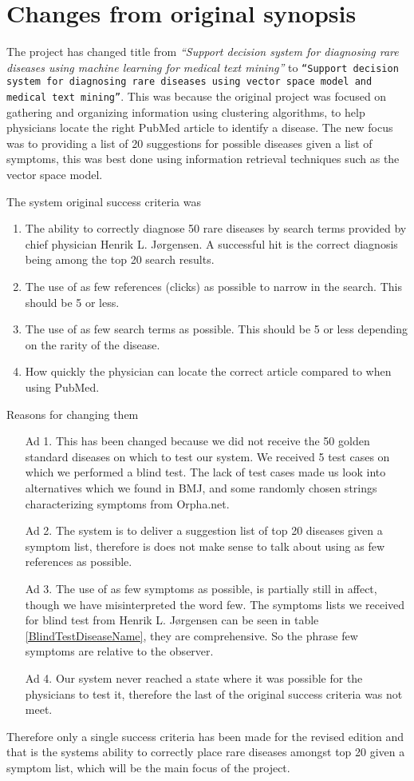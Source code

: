 \chapter*{Changes from original synopsis}

The project has changed title from \textit{``Support decision system
  for diagnosing rare diseases using machine learning for medical text
  mining''} to \texttt{``Support decision system for diagnosing rare
  diseases using vector space model and \\ medical text
  mining''}. This was because the original project was focused on
gathering and organizing information using clustering algorithms, to
help physicians locate the right PubMed article to identify a
disease. The new focus was to providing a list of 20 suggestions for
possible diseases given a list of symptoms, this was best done using
information retrieval techniques such as the vector space model.

The system original success criteria was
\begin{enumerate}
\item The ability to correctly diagnose 50 rare diseases by search
  terms provided by chief physician Henrik L. J\o rgensen. A
  successful hit is the correct diagnosis being among the top 20
  search results.
\item The use of as few references (clicks) as possible to narrow in
  the search.  This should be 5 or less.
\item The use of as few search terms as possible. This should be 5 or
  less depending on the rarity of the disease.
\item How quickly the physician can locate the correct article
  compared to when using PubMed.
\end{enumerate}

Reasons for changing them
\begin{itemize}
\item[Ad 1.] This has been changed because we did not receive the 50 golden
standard diseases on which to test our system. We received 5 test
cases on which we performed a blind test. The lack of test cases made
us look into alternatives which we found in BMJ, and some randomly
chosen strings characterizing symptoms from Orpha.net.

\item[Ad 2.] The system is to deliver a suggestion list of top 20 diseases given a
symptom list, therefore is does not make sense to talk about using as
few references as possible.

\item[Ad 3.] The use of as few symptoms as possible, is partially still in affect,
though we have misinterpreted the word few. The symptoms lists we
received for blind test from Henrik L. J\o rgensen can be seen in
table \ref{BlindTestDiseaseName}, they are comprehensive. So the
phrase few symptoms are relative to the observer.

\item[Ad 4.] Our system never reached a state where it was possible for the
physicians to test it, therefore the last of the original success
criteria was not meet.
\end{itemize}

Therefore only a single success criteria has been made for the revised
edition and that is the systems ability to correctly place rare
diseases amongst top 20 given a symptom list, which will be the main
focus of the project.

